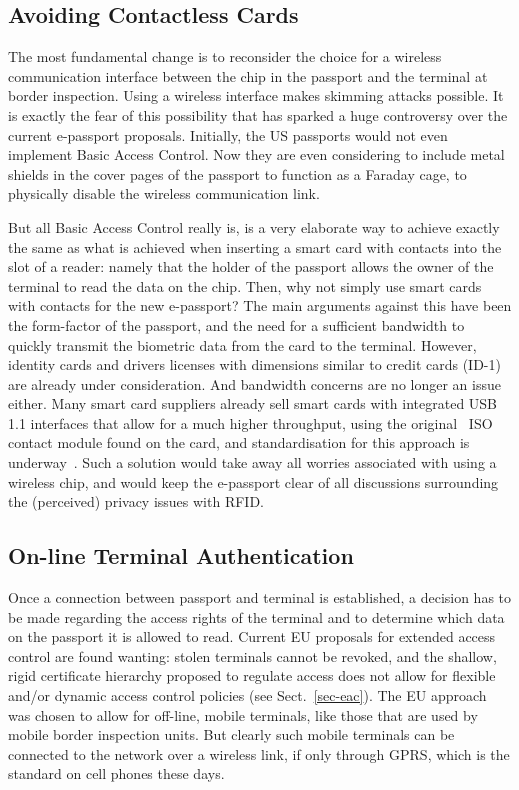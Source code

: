 \documentclass[runningheads,envcountsame,envcountsect,oribibl]{llncs}
\begin{document}
\subsection{Avoiding Contactless Cards}

The most fundamental change is to reconsider the choice for a wireless
communication interface between the chip in the passport and the terminal at
border inspection. Using a wireless interface makes skimming attacks
possible. It is exactly the fear of this possibility that has sparked a huge
controversy over the current e-passport proposals. Initially, the US passports
would not even implement Basic Access Control. Now they are even considering to
include metal shields in the cover pages of the passport to function as a
Faraday cage, to physically disable the wireless communication link.

But all Basic Access Control really is, is a very elaborate way to achieve
exactly the same as what is achieved when inserting a smart card with contacts
into the slot of a reader: namely that the holder of the passport allows the
owner of the terminal to read the data on the chip. Then, why not simply use
smart cards with contacts for the new e-passport? The main arguments
against this have been the form-factor of the passport, and the need
for a sufficient bandwidth to quickly transmit the biometric data from the card
to the terminal. However, identity cards and drivers
licenses with dimensions similar to credit cards (ID-1) are already under
consideration. And bandwidth concerns
are no longer an issue either. 
Many smart card suppliers already sell smart cards with integrated USB 1.1
interfaces that allow for a much higher throughput, using the original~\cite{ISO7816} 
ISO contact module found on the card, and standardisation for this approach
is underway~\cite{ISO7816-12}.
Such a solution would take away all worries associated with using a
wireless chip, and would keep the e-passport clear of all discussions 
surrounding the (perceived) privacy issues with RFID.

\subsection{On-line Terminal Authentication}

Once a connection between passport and terminal is established, a decision has
to be made regarding the access rights of the terminal and to determine which
data on the passport it is allowed to read. Current EU proposals for 
extended access control
are found wanting: stolen terminals cannot be revoked, and the shallow, rigid
certificate hierarchy proposed to regulate access does not allow for flexible
and/or dynamic access control policies (see Sect.~\ref{sec-eac}).
The EU approach was chosen to allow
for off-line, mobile terminals, like those that are used by mobile
border inspection units. But clearly such mobile terminals can be connected to
the network over a wireless link, if only through GPRS, which is the standard
on cell phones these days.
\end{document}
